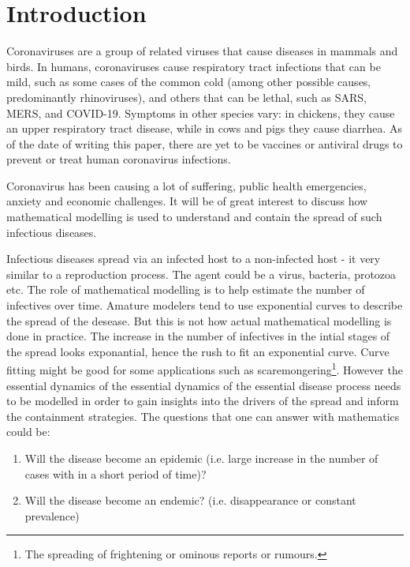 \documentclass[fontsize=17pt]{article}
\begin{document}
\tableofcontents
\newpage



\section{Introduction}
Coronaviruses are a group of related viruses that cause diseases in mammals and birds. In humans, coronaviruses cause respiratory tract infections that can be mild, such as some cases of the common cold (among other possible causes, predominantly rhinoviruses), and others that can be lethal, such as SARS, MERS, and COVID-19. Symptoms in other species vary: in chickens, they cause an upper respiratory tract disease, while in cows and pigs they cause diarrhea. As of the date of writing this paper, there are yet to be vaccines or antiviral drugs to prevent or treat human coronavirus infections.

Coronavirus has been causing a lot of suffering, public health emergencies, anxiety and economic challenges. It will be of great interest to discuss how mathematical modelling is used to understand and contain the spread of such infectious diseases.

Infectious diseases spread via an infected host to a non-infected host - it very similar to a reproduction process. The agent could be a virus, bacteria, protozoa etc. The role of mathematical modelling is to help estimate the number of infectives over time. Amature modelers tend to use exponential curves to describe the spread of the desease. But this is not how actual mathematical modelling is done in practice. The increase in the number of infectives in the intial stages of the spread looks exponantial, hence the rush to fit an exponential curve. Curve fitting might be good for some applications such as scaremongering\footnote{The spreading of frightening or ominous reports or rumours.}. However the essential dynamics of the essential dynamics of the essential disease process needs to be modelled in order to gain insights into the drivers of the spread and inform the containment strategies.
The questions that one can answer with mathematics could be:
\begin{enumerate}
	\item Will the disease become an epidemic (i.e. large increase in the number of cases with in a short period of time)?
	\item Will the disease become an endemic? (i.e. disappearance or constant prevalence) 
\end{enumerate} 
\end{document}
